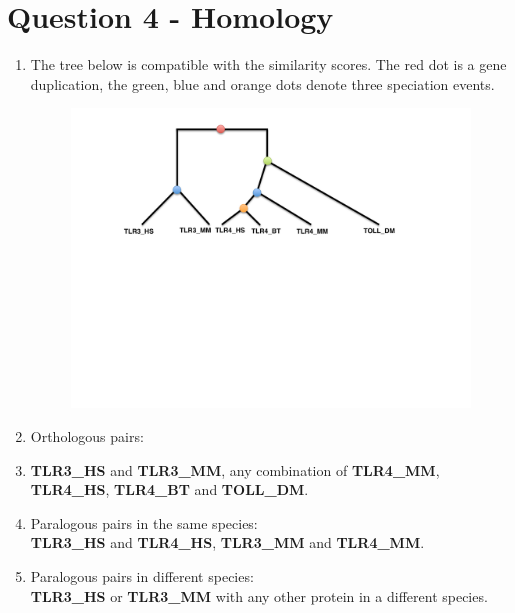 \documentclass[a4paper,11pt]{article}
\begin{document}
\section*{Question 4 - Homology}

\begin{enumerate}
\item The tree below is compatible with the similarity scores. The red
  dot is a gene duplication, the green, blue and orange dots denote
  three speciation events.

\begin{figure}[h]
\centering\includegraphics[scale=.6]{TreeSolution.pdf}
\end{figure}




\item Orthologous pairs:\\
  \item \textbf{TLR3\_HS} and \textbf{TLR3\_MM}, any combination of
    \textbf{TLR4\_MM}, \textbf{TLR4\_HS}, \textbf{TLR4\_BT} and \textbf{TOLL\_DM}.
\item Paralogous pairs in the same species:\\
\textbf{TLR3\_HS} and \textbf{TLR4\_HS}, \textbf{TLR3\_MM} and \textbf{TLR4\_MM}.
\item Paralogous pairs in different species:\\
\textbf{TLR3\_HS} or \textbf{TLR3\_MM} with any other protein in a
different species.
\end{enumerate}
\end{document}
